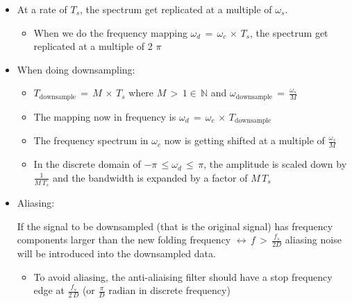 \begin{itemize}

\item At a rate of $T_s$, the spectrum get replicated at a multiple of $\omega_s$.

	\begin{itemize}
	\item When we do the frequency mapping $\omega_d \, = \, \omega_c \, \times \, T_s$, the spectrum get replicated at a multiple of 2 $\pi$
	
	
	
	\end{itemize}

\item When doing downsampling:

	\begin{itemize}
	\item $T_{\text{downsample}} \, = \, M \, \times \, T_s$ where $M \, > \, 1 \in \, \mathbb{N}$ and $\omega_{\text{downsample}} \,= \, \displaystyle\frac{\omega_s}{M}$
	
	
	\item The mapping now in frequency is $\omega_d \, = \, \omega_c \, \times \, T_{\text{downsample}}$
	
	
	\item The frequency spectrum in $\omega_c$ now is getting shifted at a multiple of $\displaystyle\frac{\omega_s}{M} $
	
	
	\item In the discrete domain of $-  \pi \, \leq\omega_d \, \leq \,  \pi$, the amplitude is scaled down by $\displaystyle\frac{1}{M \, T_s}$ and the bandwidth is expanded by a factor of $M \, T_s$
	\end{itemize}


\item Aliasing:

If the signal to be downsampled (that is the original signal) has frequency components larger than the new folding frequency $ \leftrightarrow \, f \, > \, \displaystyle\frac{f_s}{2 D}$
aliasing noise will be introduced into the downsampled data.


    \begin{itemize}
        \item To avoid aliasing, the anti-aliaising filter should have a stop frequency edge at $\displaystyle\frac{f_s}{2 \, D}$ (or $\displaystyle\frac{\pi}{D}$ radian in discrete frequency)
    \end{itemize}





\end{itemize}




